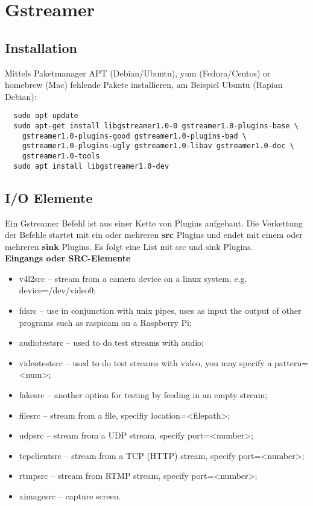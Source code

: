 \newpage
\section{Gstreamer}

\subsection{Installation}
Mittels Paketmanager APT (Debian/Ubuntu), yum (Fedora/Centos) or homebrew (Mac) 
fehlende Pakete installieren, am Beispiel Ubuntu (Rapian Debian):
\begin{verbatim}
  sudo apt update 
  sudo apt-get install libgstreamer1.0-0 gstreamer1.0-plugins-base \
    gstreamer1.0-plugins-good gstreamer1.0-plugins-bad \
    gstreamer1.0-plugins-ugly gstreamer1.0-libav gstreamer1.0-doc \
    gstreamer1.0-tools
  sudo apt install libgstreamer1.0-dev
\end{verbatim}

\subsection{I/O Elemente}
Ein Gstreamer Befehl ist aus einer Kette von Plugins aufgebaut. Die Verkettung der Befehle startet mit ein oder mehreren \textbf{src} Plugins und endet mit einem oder mehreren \textbf{sink} Plugins. Es folgt eine List mit src und sink Plugins.\\

\textbf{Eingangs oder SRC-Elemente}
\begin{itemize}
\item v4l2src – stream from a camera device on a linux system, e.g. device=/dev/video0;
\item fdsrc – use in conjunction with unix pipes, uses as input the output of other programs such as raspicam on a Raspberry Pi;
\item audiotestsrc – used to do test streams with audio;
\item videotestsrc – used to do test streams with video, you may specify a pattern=<num>;
\item fakesrc – another option for testing by feeding in an empty stream;
\item filesrc – stream from a file, specifiy location=<filepath>;
\item udpsrc – stream from a UDP stream, specify port=<number>;
\item tcpclientsrc – stream from a TCP (HTTP) stream, specify port=<number>;
\item rtmpsrc – stream from RTMP stream, specify port=<number>;
\item ximagesrc – capture screen.
\end{itemize}

